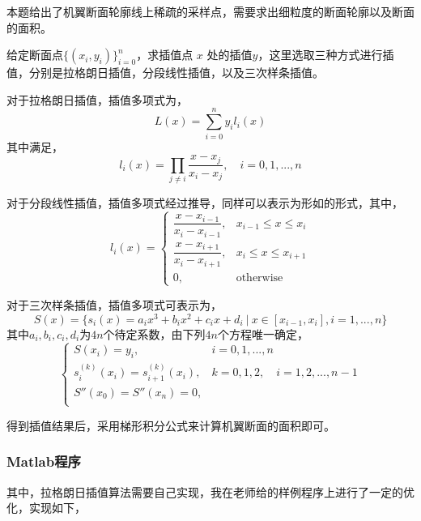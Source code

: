 \documentclass[12pt,a4paper]{article}
\begin{document}
本题给出了机翼断面轮廓线上稀疏的采样点，需要求出细粒度的断面轮廓以及断面的面积。

给定断面点$\{(x_i, y_i)\}_{i=0}^n$，求插值点 $x$ 处的插值$y$，这里选取三种方式进行插值，分别是拉格朗日插值，分段线性插值，以及三次样条插值。

对于拉格朗日插值，插值多项式为，
\begin{equation}\label{eq:lagrange}
    L(x) = \sum_{i=0}^n y_i l_i(x)
\end{equation}
其中满足，
\begin{equation}
    l_i(x) = \prod_{j \ne i} \frac{x - x_j}{x_i - x_j}, \quad i = 0,1,...,n
\end{equation}

对于分段线性插值，插值多项式经过推导，同样可以表示为形如的形式，其中，
\begin{equation}
    l_i(x) = 
    \begin{cases}
        \dfrac{x - x_{i-1}}{x_i - x_{i-1}}, & x_{i-1}\le x \le x_i\\
        \dfrac{x - x_{i+1}}{x_{i} - x_{i+1}}, & x_i \le x \le x_{i+1}\\
        0, & \text{otherwise}
    \end{cases}
\end{equation}

对于三次样条插值，插值多项式可表示为，
\begin{equation}
    S(x) = \{s_i(x)=a_i x^3 + b_i x^2 + c_i x + d_i \ |\ x\in [x_{i-1}, x_i], i=1,...,n\}
\end{equation}
其中$a_i, b_i, c_i, d_i$为$4n$个待定系数，由下列$4n$个方程唯一确定，
\begin{equation}
    \begin{cases}
        S(x_i) = y_i, & i=0,1,...,n\\
        s_i^{(k)}(x_i) = s_{i+1}^{(k)}(x_i), & k=0,1,2, \quad i=1,2,...,n-1\\
        S''(x_0) = S''(x_n) = 0, &\\
    \end{cases}
\end{equation}

得到插值结果后，采用梯形积分公式来计算机翼断面的面积即可。

\subsubsection{Matlab程序}

其中，拉格朗日插值算法需要自己实现，我在老师给的样例程序上进行了一定的优化，实现如下，

\end{document}

